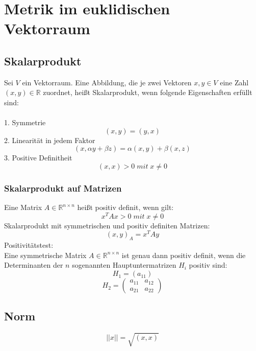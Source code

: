 \documentclass[a4paper,twocolumn,10pt]{article}
\begin{document}
\section{Metrik im euklidischen Vektorraum}

\subsection{Skalarprodukt}
Sei $V$ ein Vektorraum. Eine Abbildung, die je zwei Vektoren $x,y\in V$ eine Zahl $(x,y)\in\mathbb{R}$ zuordnet, heißt Skalarprodukt, wenn folgende Eigenschaften erfüllt sind:\\\\
1. Symmetrie
\begin{equation*}
(x,y)=(y,x)
\end{equation*}
2. Linearität in jedem Faktor
\begin{equation*}
(x,\alpha y+\beta z)=\alpha (x,y)+\beta (x,z)
\end{equation*}
3. Positive Definitheit
\begin{equation*}
(x,x)>0\;mit\;x\neq 0
\end{equation*}

\subsubsection{Skalarprodukt auf Matrizen}
Eine Matrix $A\in\mathbb{R}^{n\times n}$ heißt positiv definit, wenn gilt:
\begin{equation*}
x^TAx>0\;mit\;x\neq 0
\end{equation*}
Skalarprodukt mit symmetrischen und positiv definiten Matrizen:
\begin{equation*}
(x,y)_A=x^TAy
\end{equation*}
Positivitätstest:\\
Eine symmetrische Matrix $A\in\mathbb{R}^{n\times n}$ ist genau dann positiv definit, wenn die Determinanten der $n$ sogenannten Hauptuntermatrizen $H_i$ positiv sind:
\begin{equation*}
H_1=(a_{11})
\end{equation*}
\begin{equation*}
H_2=\begin{pmatrix}a_{11} & a_{12} \\ a_{21} & a_{22}\end{pmatrix}
\end{equation*}

\subsection{Norm}
\begin{equation*}
||x||=\sqrt{(x,x)}
\end{equation*}
\end{document}
